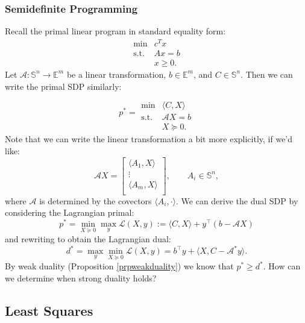 \documentclass{article}
\numberwithin{equation}{section}
\theoremstyle{definition}
\newcommand{\bE}{\mathbb{E}}
\newcommand{\bS}{\mathbb{S}}
\newcommand{\cA}{\mathcal{A}}
\newcommand{\cL}{\mathcal{L}}
\newcommand{\tst}{\text{s.t.}}
\begin{document}
\subsubsection{Semidefinite Programming}
Recall the primal linear program in standard equality form:
\begin{equation}
    \begin{array}{cc}
         \min &c^Tx  \\
         \tst & Ax=b\\
              & x\ge 0.
    \end{array}
\end{equation}
Let $\cA:\bS^n\to\bE^m$ be a linear transformation, $b\in\bE^m$, and $C\in\bS^n$. Then we can write the primal SDP similarly:
\vspace{-2\baselineskip}
\begin{equation}
    p^*=\begin{array}{cc}
    &\\&\\
         \min & \langle C, X\rangle  \\
         \tst & \cA X=b\\
              & X\succeq 0.
    \end{array}
\end{equation}
Note that we can write the linear transformation a bit more explicitly, if we'd like:
\begin{equation}
    \cA X=\begin{bmatrix}
        \langle A_1, X\rangle\\
        \vdots\\
        \langle A_m, X\rangle\\
    \end{bmatrix},\qquad A_i\in\bS^n,
\end{equation}
where $\cA$ is determined by the covectors $\langle A_i, \cdot\rangle$. We can derive the dual SDP by considering the Lagrangian primal:
\begin{equation}
    p^*=\min_{X\succeq 0}\max_y\cL(X,y):=\langle C,X\rangle+y^\top(b-\cA X)
\end{equation}
and rewriting to obtain the Lagrangian dual:
\begin{equation}
    d^*=\max_y\min_{X\succeq 0}\cL(X,y)=b^\top y+\langle X, C-\cA^*y\rangle.
\end{equation}
By weak duality (Proposition \ref{prpweakduality}) we know that $p^*\ge d^*$. How can we determine when strong duality holds?
\subsection{Least Squares}
\end{document}
